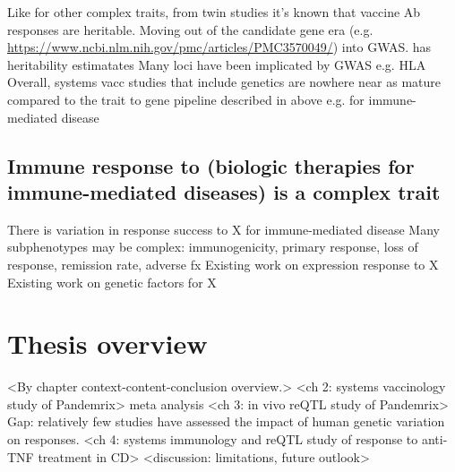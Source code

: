 \begin{outline}
\1 Like for other complex traits, from twin studies it's known that vaccine Ab responses are heritable.
    \2 Moving out of the candidate gene era (e.g. \url{https://www.ncbi.nlm.nih.gov/pmc/articles/PMC3570049/}) into GWAS.
    \2 \autocite{oconnor2013CharacterizingVaccineResponses} has heritability estimatates
    \2 Many loci have been implicated by GWAS e.g. HLA \autocite{oconnor2013CharacterizingVaccineResponses,mooney2013SystemsImmunogeneticsVaccines,mentzer2015SearchingHumanGenetic,linnik2016ImpactHostGenetic,scepanovic2018HumanGeneticVariants,dhakal2019HostFactorsImpact}
    \2 Overall, systems vacc studies that include genetics are nowhere near as mature compared to the trait to gene pipeline described in above e.g. for immune-mediated disease

    \subsection{Immune response to (biologic therapies for immune-mediated diseases) is a complex trait}

\1 There is variation in response success to X for immune-mediated disease
\1 Many subphenotypes may be complex: immunogenicity, primary response, loss of response, remission rate, adverse fx
\1 Existing work on expression response to X 
\1 Existing work on genetic factors for X 

\section{Thesis overview}

\1 <By chapter context-content-conclusion overview.>
    \2 <ch 2: systems vaccinology study of Pandemrix>
        \3 meta analysis
    \2 <ch 3: in vivo reQTL study of Pandemrix>
        \3 Gap: relatively few studies have assessed the impact of human genetic variation on responses.
    \2 <ch 4: systems immunology and reQTL study of response to anti-TNF treatment in CD>
    \2 <discussion: limitations, future outlook>

\end{outline}

